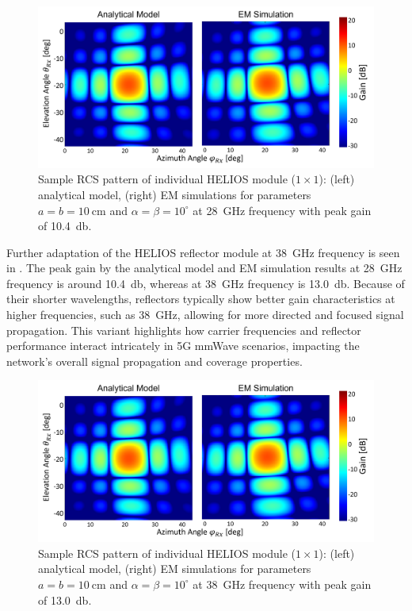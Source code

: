 \begin{figure}[tb]
	\centering
	\includegraphics[width=0.82\linewidth]{images/Section 3 Images/Heatmap_1D}
	\caption{Sample RCS pattern of individual HELIOS module ($1 \times 1$): (left) analytical model, (right) EM simulations for parameters $a=b=\SI{10}{\centi\meter}$ and $\alpha=\beta=\num{10}^\circ$ at \SI{28}{\giga\hertz} frequency with peak gain of \SI{10.4}{\decibel}.}
	\label{fig:heatmap1d}
\end{figure}
Further adaptation of the HELIOS reflector module at \SI{38}{\giga\hertz} frequency is seen in . The peak gain by the analytical model and EM simulation results at \SI{28}{\giga\hertz} frequency is around \SI{10.4}{\decibel}, whereas at \SI{38}{\giga\hertz} frequency is \SI{13.0}{\decibel}. Because of their shorter wavelengths, reflectors typically show better gain characteristics at higher frequencies, such as \SI{38}{\giga\hertz}, allowing for more directed and focused signal propagation. This variant highlights how carrier frequencies and reflector performance interact intricately in 5G mmWave scenarios, impacting the network's overall signal propagation and coverage properties.
\begin{figure}[H]
	\centering
	\includegraphics[width=0.82\linewidth]{images/Section 3 Images/Heatmap_1D}
	\caption{Sample RCS pattern of individual HELIOS module ($1 \times 1$): (left) analytical model, (right) EM simulations for parameters $a=b=\SI{10}{\centi\meter}$ and $\alpha=\beta=\num{10}^\circ$ at \SI{38}{\giga\hertz} frequency with peak gain of \SI{13.0}{\decibel}.}
	\label{fig:heatmap_38GHz}
\end{figure}
